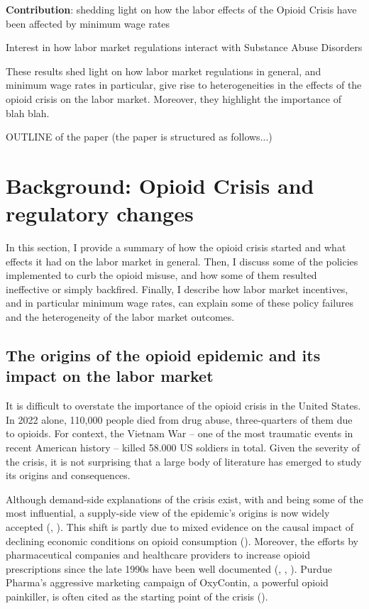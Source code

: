 \documentclass[12pt,a4paper]{article}
\begin{document}
\textbf{Contribution}: shedding light on how the labor effects of the Opioid Crisis have been affected by minimum wage rates

Interest in how labor market regulations interact with Substance Abuse Disorders

These results shed light on how labor market regulations in general, and minimum wage rates in particular, give rise to heterogeneities in the effects of the opioid crisis on the labor market.
Moreover, they highlight the importance of blah blah.

OUTLINE of the paper (the paper is structured as follows...)

\section*{Background: Opioid Crisis and regulatory changes}

In this section, I provide a summary of how the opioid crisis started and what effects it had on the labor market in general. 
Then, I discuss some of the policies implemented to curb the opioid misuse, and how some of them resulted ineffective or simply backfired. 
Finally, I describe how labor market incentives, and in particular minimum wage rates, can explain some of these policy failures and the heterogeneity of the labor market outcomes.

\subsection*{The origins of the opioid epidemic and its impact on the labor market}

It is difficult to overstate the importance of the opioid crisis in the United States. 
In 2022 alone, 110,000 people died from drug abuse, three-quarters of them due to opioids.
For context, the Vietnam War -- one of the most traumatic events in recent American history -- killed 58.000 US soldiers in total.
Given the severity of the crisis, it is not surprising that a large body of literature has emerged to study its origins and consequences.

Although demand-side explanations of the crisis exist, with \textcite{Deaton2017} and \textcite{Deaton2015} being some of the most influential, a supply-side view of the epidemic's origins is now widely accepted (\cite{Eichmeyer2022}, \cite{Ruhm2018}). 
This shift is partly due to mixed evidence on the causal impact of declining economic conditions on opioid consumption (\cite{Currie2018}).
Moreover, the efforts by pharmaceutical companies and healthcare providers to increase opioid prescriptions since the late 1990s have been well documented (\cite{Alpert2019}, \cite{Kolodny2015}, \cite{VanZee2008}).
Purdue Pharma's aggressive marketing campaign of OxyContin, a powerful opioid painkiller, is often cited as the starting point of the crisis (\cite{Chow2019}).
\end{document}
